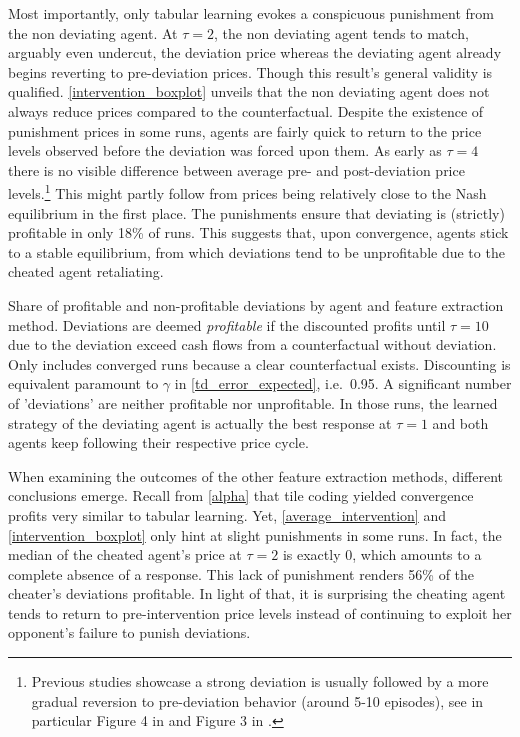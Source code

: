 Most importantly, only tabular learning evokes a conspicuous punishment from the non deviating agent. At $\tau = 2$, the non deviating agent tends to match, arguably even undercut, the deviation price whereas the deviating agent already begins reverting to pre-deviation prices. Though this result's general validity is qualified. \autoref{intervention_boxplot} unveils that the non deviating agent does not always reduce prices compared to the counterfactual. Despite the existence of punishment prices in some runs, agents are fairly quick to return to the price levels observed before the deviation was forced upon them. As early as $\tau = 4$ there is no visible difference between average pre- and post-deviation price levels.\footnote{Previous studies showcase a strong deviation is usually followed by a more gradual reversion to pre-deviation behavior (around 5-10 episodes), see in particular Figure 4 in \textcite{calvano_algorithmic_2018} and Figure 3 in \textcite{klein_autonomous_2019}.} This might partly follow from prices being relatively close to the Nash equilibrium in the first place. The punishments ensure that deviating is (strictly) profitable in only 18\% of runs. This suggests that, upon convergence, agents stick to a stable equilibrium, from which deviations tend to be unprofitable due to the cheated agent retaliating.

\begin{center}
	\begin{table}
		
		\caption{Share of profitable and non-profitable deviations by agent and feature extraction method. Deviations are deemed \emph{profitable} if the discounted profits until $\tau = 10$ due to the deviation exceed cash flows from a counterfactual without deviation. Only includes converged runs because a clear counterfactual exists. Discounting is equivalent paramount to $\gamma$ in \autoref{td_error_expected}, i.e.\ 0.95. A significant number of 'deviations' are neither profitable nor unprofitable. In those runs, the learned strategy of the deviating agent is actually the best response at $\tau = 1$ and both agents keep following their respective price cycle.}
		\label{share_deviation_profitability}
	\end{table}
\end{center}

When examining the outcomes of the other feature extraction methods, different conclusions emerge. Recall from \autoref{alpha} that tile coding yielded convergence profits very similar to tabular learning. Yet, \autoref{average_intervention} and \autoref{intervention_boxplot} only hint at slight punishments in some runs. In fact, the median of the cheated agent's price at $\tau = 2$ is exactly 0, which amounts to a complete absence of a response. This lack of punishment renders 56\% of the cheater's deviations profitable. In light of that, it is surprising the cheating agent tends to return to pre-intervention price levels instead of continuing to exploit her opponent's failure to punish deviations.

